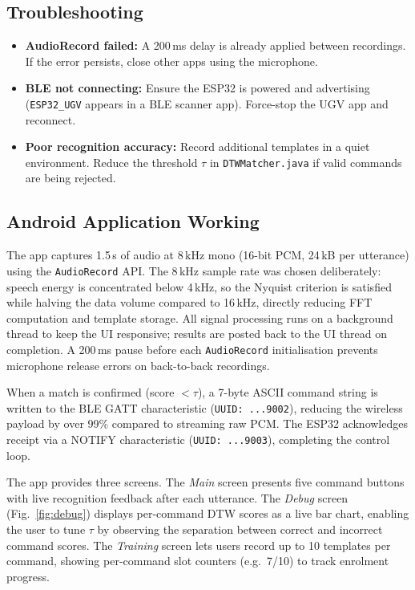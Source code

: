 \documentclass[conference]{IEEEtran}
\begin{document}
	\subsection{Troubleshooting}
	
	\begin{itemize}
		\item \textbf{AudioRecord failed:} A 200\,ms delay is already applied
		between recordings. If the error persists, close other apps
		using the microphone.
		\item \textbf{BLE not connecting:} Ensure the ESP32 is powered and
		advertising (\texttt{ESP32\_UGV} appears in a BLE scanner app).
		Force-stop the UGV app and reconnect.
		\item \textbf{Poor recognition accuracy:} Record additional templates
		in a quiet environment. Reduce the threshold $\tau$ in
		\texttt{DTWMatcher.java} if valid commands are being rejected.
	\end{itemize}



	\subsection{Android Application Working}
	The app captures 1.5\,s of audio at 8\,kHz mono (16-bit PCM, 24\,kB per
	utterance) using the \texttt{AudioRecord} API. The 8\,kHz sample rate was
chosen deliberately: speech energy is concentrated below 4\,kHz, so the
Nyquist criterion is satisfied while halving the data volume compared to
16\,kHz, directly reducing FFT computation and template storage. All
signal processing runs on a background thread to keep the UI responsive;
results are posted back to the UI thread on completion. A 200\,ms pause
before each \texttt{AudioRecord} initialisation prevents microphone
release errors on back-to-back recordings.

When a match is confirmed (score $< \tau$), a 7-byte ASCII command string
is written to the BLE GATT characteristic (\texttt{UUID:~...9002}),
reducing the wireless payload by over 99\% compared to streaming raw PCM.
The ESP32 acknowledges receipt via a NOTIFY characteristic
(\texttt{UUID:~...9003}), completing the control loop.

The app provides three screens. The \textit{Main} screen presents five
command buttons with live recognition feedback after each utterance.
The \textit{Debug} screen (Fig.~\ref{fig:debug}) displays per-command
DTW scores as a live bar chart, enabling the user to tune $\tau$ by
observing the separation between correct and incorrect command scores.
The \textit{Training} screen lets users record up to 10 templates per
command, showing per-command slot counters (e.g.\ 7/10) to track
enrolment progress.
	
\end{document}
